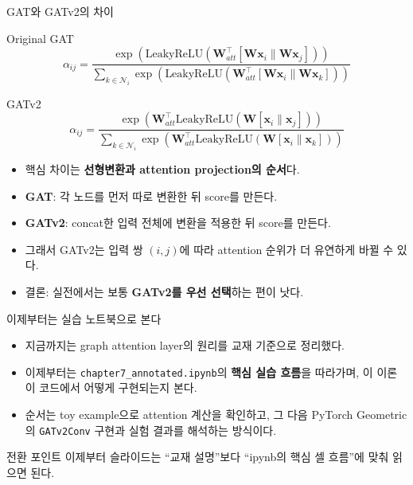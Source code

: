 \begin{frame}{GAT와 GATv2의 차이}
\small
\begin{block}{Original GAT}
\[
\alpha_{ij} =
\frac{
\exp\left(
\text{LeakyReLU}\left(
\mathbf{W}_{att}^{\top}
[\mathbf{W}\mathbf{x}_i \| \mathbf{W}\mathbf{x}_j]
\right)
\right)
}{
\sum_{k\in\mathcal{N}_i}
\exp\left(
\text{LeakyReLU}\left(
\mathbf{W}_{att}^{\top}
[\mathbf{W}\mathbf{x}_i \| \mathbf{W}\mathbf{x}_k]
\right)
\right)
}
\]
\end{block}
\vspace{0.3em}
\begin{block}{GATv2}
\[
\alpha_{ij} =
\frac{
\exp\left(
\mathbf{W}_{att}^{\top}
\text{LeakyReLU}\left(
\mathbf{W}[\mathbf{x}_i \| \mathbf{x}_j]
\right)
\right)
}{
\sum_{k\in\mathcal{N}_i}
\exp\left(
\mathbf{W}_{att}^{\top}
\text{LeakyReLU}\left(
\mathbf{W}[\mathbf{x}_i \| \mathbf{x}_k]
\right)
\right)
}
\]
\end{block}
\vspace{0.3em}
\begin{itemize}
  \item 핵심 차이는 \textbf{선형변환과 attention projection의 순서}다.
  \item \textbf{GAT}: 각 노드를 먼저 따로 변환한 뒤 score를 만든다.
  \item \textbf{GATv2}: concat한 입력 전체에 변환을 적용한 뒤 score를 만든다.
  \item 그래서 GATv2는 입력 쌍 $(i,j)$에 따라 attention 순위가 더 유연하게 바뀔 수 있다.
  \item 결론: 실전에서는 보통 \textbf{GATv2를 우선 선택}하는 편이 낫다.
\end{itemize}
\end{frame}

\begin{frame}{이제부터는 실습 노트북으로 본다}
\begin{itemize}
  \item 지금까지는 graph attention layer의 원리를 교재 기준으로 정리했다.
  \item 이제부터는 \texttt{chapter7\_annotated.ipynb}의 \textbf{핵심 실습 흐름}을 따라가며, 이 이론이 코드에서 어떻게 구현되는지 본다.
  \item 순서는 toy example으로 attention 계산을 확인하고, 그 다음 PyTorch Geometric의 \texttt{GATv2Conv} 구현과 실험 결과를 해석하는 방식이다.
\end{itemize}
\vspace{0.3em}
\begin{block}{전환 포인트}
이제부터 슬라이드는 ``교재 설명''보다 ``ipynb의 핵심 셀 흐름''에 맞춰 읽으면 된다.
\end{block}
\end{frame}

